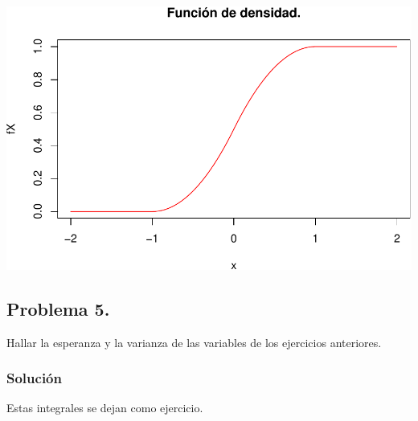 \documentclass[
]{article}
\begin{document}
\includegraphics{Tema-2---Variables-Aleatorias_parte2_continuas_Soluciones_files/figure-latex/unnamed-chunk-4-1.pdf}

\hypertarget{problema-5.}{%
\subsection{Problema 5.}\label{problema-5.}}

Hallar la esperanza y la varianza de las variables de los ejercicios
anteriores.

\hypertarget{soluciuxf3n-4}{%
\subsubsection{Solución}\label{soluciuxf3n-4}}

Estas integrales se dejan como ejercicio.
\end{document}
